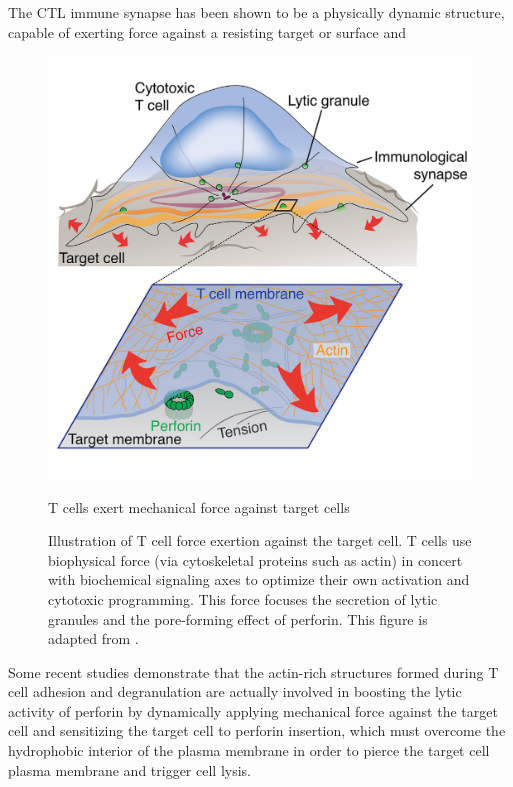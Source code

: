 The CTL immune synapse has been shown to be a physically dynamic structure, capable of exerting force against a resisting target or surface and 

\begin{figure}[htbp]
	\centering
	\includegraphics[width=\textwidth]{../figures/chapter1/mechforce.png}
	\caption{T cells exert mechanical force against target cells}
	\caption*{Illustration of T cell force exertion against the target cell. T cells use biophysical force (via cytoskeletal proteins such as actin) in concert with biochemical signaling axes to optimize their own activation and cytotoxic programming.  This force focuses the secretion of lytic granules and the pore-forming effect of perforin. This figure is adapted from \cite{Rak2011}.}
	\label{fig:mechforce}
\end{figure}

Some recent studies demonstrate that the actin-rich structures formed during T cell adhesion and degranulation are actually involved in boosting the lytic activity of perforin by dynamically applying mechanical force against the target cell \cite{Basu2016, Tamzalit2018} and sensitizing the target cell to perforin insertion, which must overcome the hydrophobic interior of the plasma membrane in order to pierce the target cell plasma membrane and trigger cell lysis.

